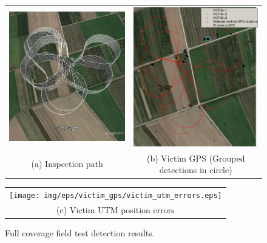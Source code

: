 \documentclass[runningheads]{llncs}
\begin{document}
\begin{figure}[!ht]
  \centering
  \begin{tabular}{cc}
    \hspace{-0.5cm}
    \includegraphics[width=7cm]{img/eps/victim_gps/SIP.eps} &
    \includegraphics[width=7cm]{img/eps/victim_gps/SIP_detections_map.eps} \\
    \small (a) Inspection path & 
    \small (b) Victim GPS \tiny (Grouped detections in circle)
  \end{tabular}

  \vspace{\floatsep}
  
  \begin{tabular}{c}
    \texttt{[image: img/eps/victim\_gps/victim\_utm\_errors.eps]} \\
    \small (c) Victim UTM position errors
  \end{tabular}

  \caption{Full coverage field test detection results.}\label{fig:victim_gps}
\end{figure}
\end{document}
